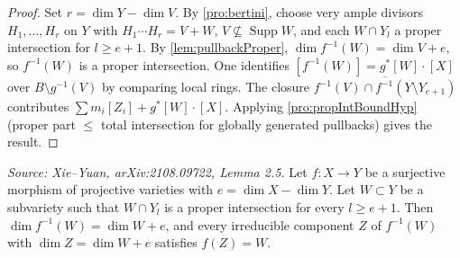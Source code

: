 \begin{proof}
  Set \(r = \dim Y - \dim V\).
  By \cref{pro:bertini}, choose very ample divisors \(H_1,\dots,H_r\) on \(Y\) with
  \(H_1 \cdots H_r = V + W\), \(V \not\subseteq \operatorname{Supp}W\), and each
  \(W \cap Y_l\) a proper intersection for \(l \geq e+1\).
  By \cref{lem:pullbackProper}, \(\dim f^{-1}(W) = \dim V + e\), so \(f^{-1}(W)\) is a
  proper intersection.
  One identifies \([f^{-1}(W)] = g^*[W] \cdot [X]\) over \(B \setminus g^{-1}(V)\) by
  comparing local rings.
  The closure \(\overline{f^{-1}(V) \cap f^{-1}(Y \setminus Y_{e+1})}\) contributes
  \(\sum m_i[Z_i] + g^*[W] \cdot [X]\).
  Applying \cref{pro:propIntBoundHyp} (proper part \(\leq\) total intersection for globally
  generated pullbacks) gives the result.
\end{proof}

\begin{lemma}
  \label{lem:pullbackProper}
  \textit{Source: Xie--Yuan, arXiv:2108.09722, Lemma 2.5.}
  Let \(f\colon X \to Y\) be a surjective morphism of projective varieties with
  \(e = \dim X - \dim Y\).
  Let \(W \subset Y\) be a subvariety such that \(W \cap Y_l\) is a proper intersection for
  every \(l \geq e+1\).
  Then \(\dim f^{-1}(W) = \dim W + e\), and every irreducible component \(Z\) of \(f^{-1}(W)\)
  with \(\dim Z = \dim W + e\) satisfies \(f(Z) = W\).
\end{lemma}

